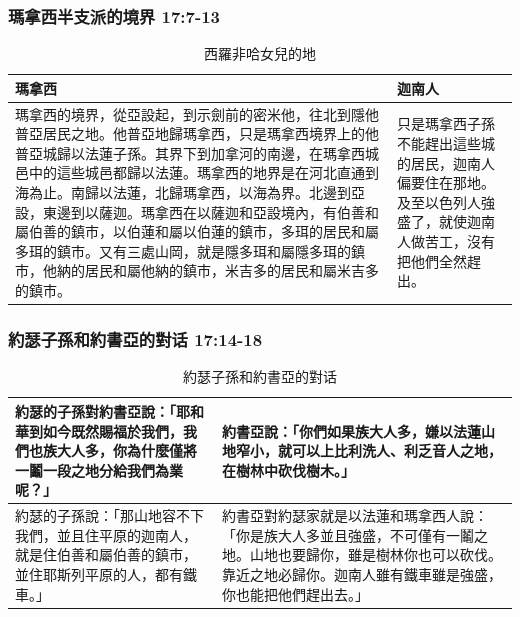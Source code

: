 \subsubsection{瑪拿西半支派的境界 17:7-13}
\begin{table}[H]
\centering
\begin{tabular}{p{13.8cm}|p{3.34cm}}\hline\hline
瑪拿西&迦南人\\\hline
瑪拿西的境界，從亞設起，到示劍前的密米他，往北到隱他普亞居民之地。他普亞地歸瑪拿西，只是瑪拿西境界上的他普亞城歸以法蓮子孫。其界下到加拿河的南邊，在瑪拿西城邑中的這些城邑都歸以法蓮。瑪拿西的地界是在河北直通到海為止。南歸以法蓮，北歸瑪拿西，以海為界。北邊到亞設，東邊到以薩迦。瑪拿西在以薩迦和亞設境內，有伯善和屬伯善的鎮市，以伯蓮和屬以伯蓮的鎮市，多珥的居民和屬多珥的鎮市。又有三處山岡，就是隱多珥和屬隱多珥的鎮市，他納的居民和屬他納的鎮市，米吉多的居民和屬米吉多的鎮市。 &只是瑪拿西子孫不能趕出這些城的居民，迦南人偏要住在那地。及至以色列人強盛了，就使迦南人做苦工，沒有把他們全然趕出。
\\\hline
 \end{tabular}
\caption{西羅非哈女兒的地 }
\end{table}

\subsubsection{約瑟子孫和約書亞的對话 17:14-18}
\begin{table}[H]
\centering
\begin{tabular}{p{6.5cm}|p{10.5cm}}
\hline
\hline
約瑟的子孫對約書亞說：「耶和華到如今既然賜福於我們，我們也族大人多，你為什麼僅將一鬮一段之地分給我們為業呢？」 &約書亞說：「你們如果族大人多，嫌以法蓮山地窄小，就可以上比利洗人、利乏音人之地，在樹林中砍伐樹木。」 \\\hline
約瑟的子孫說：「那山地容不下我們，並且住平原的迦南人，就是住伯善和屬伯善的鎮市，並住耶斯列平原的人，都有鐵車。」&約書亞對約瑟家就是以法蓮和瑪拿西人說：「你是族大人多並且強盛，不可僅有一鬮之地。山地也要歸你，雖是樹林你也可以砍伐。靠近之地必歸你。迦南人雖有鐵車雖是強盛，你也能把他們趕出去。」\\\hline
 \end{tabular}
\caption{約瑟子孫和約書亞的對话}
\end{table}
 

